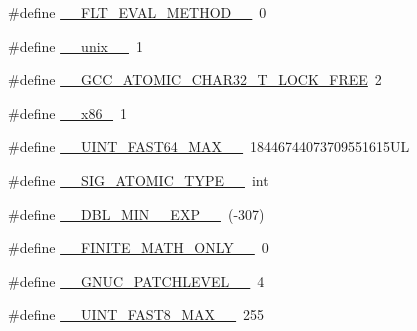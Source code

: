\begin{DoxyCompactItemize}
\item 
\#define \hyperlink{build-analizer__host-_desktop___qt__5__9__0___g_c_c__64bit-_release_2moc__predefs_8h_a737828904768e0ab49acbdb3371d8445}{\+\_\+\+\_\+\+F\+L\+T\+\_\+\+E\+V\+A\+L\+\_\+\+M\+E\+T\+H\+O\+D\+\_\+\+\_\+}~0
\item 
\#define \hyperlink{build-analizer__host-_desktop___qt__5__9__0___g_c_c__64bit-_release_2moc__predefs_8h_aa5be39d362c571d48d6236f0bd58f1fc}{\+\_\+\+\_\+unix\+\_\+\+\_\+}~1
\item 
\#define \hyperlink{build-analizer__host-_desktop___qt__5__9__0___g_c_c__64bit-_release_2moc__predefs_8h_a98e298953067135caf4bc0b8e8e7cd01}{\+\_\+\+\_\+\+G\+C\+C\+\_\+\+A\+T\+O\+M\+I\+C\+\_\+\+C\+H\+A\+R32\+\_\+\+T\+\_\+\+L\+O\+C\+K\+\_\+\+F\+R\+E\+E}~2
\item 
\#define \hyperlink{build-analizer__host-_desktop___qt__5__9__0___g_c_c__64bit-_release_2moc__predefs_8h_a64b6ba77bbc2cb5db2a19f32e954fcc3}{\+\_\+\+\_\+x86\+\_}~1
\item 
\#define \hyperlink{build-analizer__host-_desktop___qt__5__9__0___g_c_c__64bit-_release_2moc__predefs_8h_a17a1ff08595cf7e0c9d1f162b727ccb6}{\+\_\+\+\_\+\+U\+I\+N\+T\+\_\+\+F\+A\+S\+T64\+\_\+\+M\+A\+X\+\_\+\+\_\+}~18446744073709551615\+U\+L
\item 
\#define \hyperlink{build-analizer__host-_desktop___qt__5__9__0___g_c_c__64bit-_release_2moc__predefs_8h_ac60fe3845f87fdaf6365a733ede87cfe}{\+\_\+\+\_\+\+S\+I\+G\+\_\+\+A\+T\+O\+M\+I\+C\+\_\+\+T\+Y\+P\+E\+\_\+\+\_\+}~int
\item 
\#define \hyperlink{build-analizer__host-_desktop___qt__5__9__0___g_c_c__64bit-_release_2moc__predefs_8h_a1abd7cf346a460459d7fe1a9d4b5dde9}{\+\_\+\+\_\+\+D\+B\+L\+\_\+\+M\+I\+N\+\_\+\_\+\+E\+X\+P\+\_\+\+\_\+}~(-\/307)
\item 
\#define \hyperlink{build-analizer__host-_desktop___qt__5__9__0___g_c_c__64bit-_release_2moc__predefs_8h_a611d40c375b1972669292fd27bc4afb7}{\+\_\+\+\_\+\+F\+I\+N\+I\+T\+E\+\_\+\+M\+A\+T\+H\+\_\+\+O\+N\+L\+Y\+\_\+\+\_\+}~0
\item 
\#define \hyperlink{build-analizer__host-_desktop___qt__5__9__0___g_c_c__64bit-_release_2moc__predefs_8h_ad149c0565fcf669b23f483e5b7f80dbd}{\+\_\+\+\_\+\+G\+N\+U\+C\+\_\+\+P\+A\+T\+C\+H\+L\+E\+V\+E\+L\+\_\+\+\_\+}~4
\item 
\#define \hyperlink{build-analizer__host-_desktop___qt__5__9__0___g_c_c__64bit-_release_2moc__predefs_8h_a27b5eb7cfda61c7f1baeb4d95f3052bb}{\+\_\+\+\_\+\+U\+I\+N\+T\+\_\+\+F\+A\+S\+T8\+\_\+\+M\+A\+X\+\_\+\+\_\+}~255

\end{DoxyCompactItemize}
